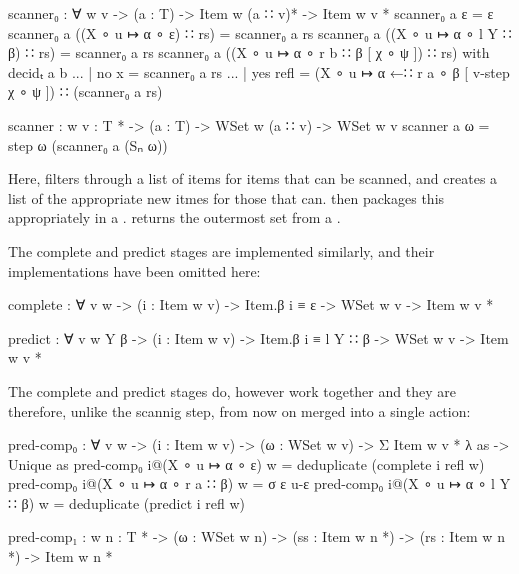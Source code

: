 		\begin{code}
	
			scanner₀ : ∀ {w v} ->
			  (a : T) ->
			  Item w (a ∷ v)* ->
			  Item w v *
			scanner₀ a ε = ε
			scanner₀ a ((X ∘ u ↦ α ∘ ε) ∷ rs) = scanner₀ a rs
			scanner₀ a ((X ∘ u ↦ α ∘ l Y ∷ β) ∷ rs) = scanner₀ a rs
			scanner₀ a ((X ∘ u ↦ α ∘ r b ∷ β [ χ ∘ ψ ]) ∷ rs) with decidₜ a b
			... | no x = scanner₀ a rs
			... | yes refl = 
			  (X ∘ u ↦ α ←∷ r a ∘ β [ v-step χ ∘ ψ ]) ∷ (scanner₀ a rs)
			
			scanner : {w v : T *} ->
			  (a : T) ->
			  WSet w (a ∷ v) ->
			  WSet w v
			scanner a ω = step ω (scanner₀ a (Sₙ ω))
		
		\end{code}
		
		Here,  filters through a list of items for items
		that can be scanned, and creates a list of the appropriate new itmes
		for those that can.  then packages this appropriately
		in a .  returns the outermost set from a
		.
		
		The complete and predict stages are implemented similarly, and their 
		implementations have been omitted here:
		
		\begin{code}
			
			complete : ∀ {v w} -> (i : Item w v) -> Item.β i ≡ ε ->
			  WSet w v -> Item w v *
		
			predict : ∀ {v w Y β} -> (i : Item w v) -> Item.β i ≡ l Y ∷ β ->
			  WSet w v -> Item w v *

		\end{code}
		
 		The complete and predict stages do, however work together and they are
 		therefore, unlike the scannig step, from now on merged into a single
 		action:
 		
		\begin{code}
			
			pred-comp₀ : ∀ {v w} ->
			  (i : Item w v) ->
			  (ω : WSet w v) ->
			  Σ {Item w v *} λ as -> Unique as
			pred-comp₀ i@(X ∘ u ↦ α ∘ ε) w = deduplicate (complete i refl w)
			pred-comp₀ i@(X ∘ u ↦ α ∘ r a ∷ β) w = σ ε u-ε
			pred-comp₀ i@(X ∘ u ↦ α ∘ l Y ∷ β) w = deduplicate (predict i refl w)
			
			pred-comp₁ : {w n : T *} -> (ω : WSet w n) ->
			  (ss : Item w n *) -> (rs : Item w n *) -> Item w n *
		
		\end{code}
			
